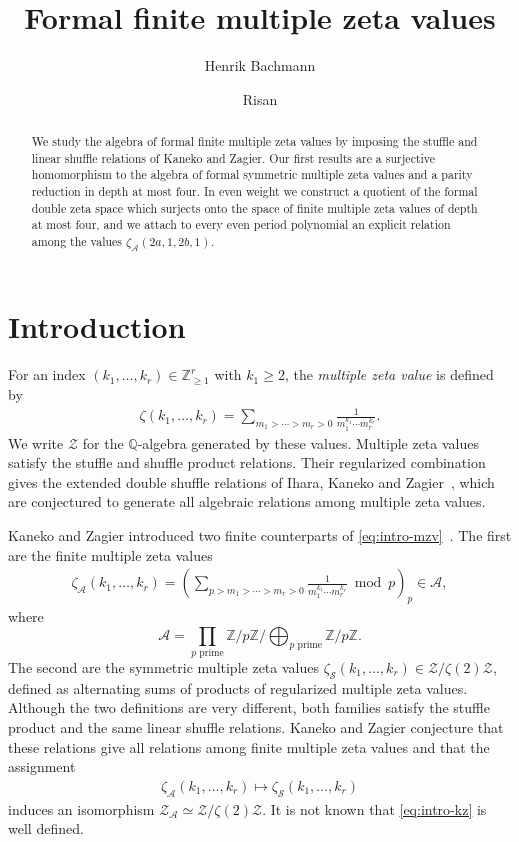 \documentclass[12pt]{amsart}
\title{Formal finite multiple zeta values}
\author{Henrik Bachmann}
\author{Risan}
\date{}
\numberwithin{equation}{section}
\theoremstyle{plain}
\newcommand{\QQ}{\mathbb{Q}}
\newcommand{\ZZ}{\mathbb{Z}}
\newcommand{\A}{\mathcal A}
\newcommand{\ZA}{{\mathcal Z_{\mathcal A}}}
\newcommand{\za}[1]{\zeta_{\mathcal A}(#1)}
\newcommand{\zs}[1]{\zeta_{\mathcal S}(#1)}
\begin{document}
\begin{abstract}
We study the algebra of formal finite multiple zeta values by imposing the
stuffle and linear shuffle relations of Kaneko and Zagier. Our first results
are a surjective homomorphism to the algebra of formal symmetric multiple
zeta values and a parity reduction in depth at most four. In even weight we
construct a quotient of the formal double zeta space which surjects onto the
space of finite multiple zeta values of depth at most four, and we attach to
every even period polynomial an explicit relation among the values
$\zeta_{\mathcal A}(2a,1,2b,1)$.
\end{abstract}

\maketitle

\section{Introduction}

For an index $(k_1,\ldots,k_r) \in \ZZ_{\geq 1}^r$ with $k_1\geq2$, the \emph{multiple zeta
value} is defined by
\begin{align}\label{eq:intro-mzv}
 \zeta(k_1,\ldots,k_r)
 =\sum_{m_1>\cdots>m_r>0}
 \frac{1}{m_1^{k_1}\cdots m_r^{k_r}}.
\end{align}
We write $\mathcal Z$ for the $\QQ$-algebra generated by these values.
Multiple zeta values satisfy the stuffle and shuffle product relations. Their
regularized combination gives the extended double shuffle relations of Ihara,
Kaneko and Zagier~\cite{IKZ}, which are conjectured to generate all algebraic
relations among multiple zeta values.

Kaneko and Zagier introduced two finite counterparts of
\eqref{eq:intro-mzv}~\cite{KZ}. The first are the finite multiple zeta values
\begin{align}\label{eq:intro-fmzv}
 \za{k_1,\ldots,k_r}
 =\left(\sum_{p>m_1>\cdots>m_r>0}
 \frac{1}{m_1^{k_1}\cdots m_r^{k_r}}\bmod p\right)_p
 \in\A,
\end{align}
where
\[
 \A=\prod_{p\text{ prime}}\ZZ/p\ZZ\bigg/\bigoplus_{p\text{ prime}}\ZZ/p\ZZ.
\]
The second are the symmetric multiple zeta values
$\zs{k_1,\ldots,k_r}\in\mathcal Z/\zeta(2)\mathcal Z$, defined as alternating
sums of products of regularized multiple zeta values. Although the two
definitions are very different, both families satisfy the stuffle product and
the same linear shuffle relations. Kaneko and Zagier conjecture that these
relations give all relations among finite multiple zeta values and that the
assignment
\begin{align}\label{eq:intro-kz}
 \za{k_1,\ldots,k_r}\longmapsto\zs{k_1,\ldots,k_r}
\end{align}
induces an isomorphism
$\ZA\simeq\mathcal Z/\zeta(2)\mathcal Z$. It is not known that
\eqref{eq:intro-kz} is well defined.
\end{document}
